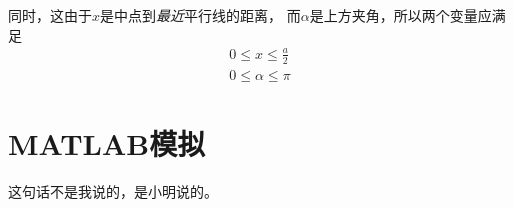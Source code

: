 \documentclass[10pt,a4paper,column,twoside,UTF8]{ctexart}
\begin{document}
		同时，这由于$x$是中点到\emph{最近}平行线的距离，
		而$\alpha$是上方夹角，所以两个变量应满足
		\begin{gather}
			0 \leq x \leq \frac{a}{2}\\
			0 \leq \alpha \leq \pi
		\end{gather}


	\section{MATLAB模拟}
		这句话不是我说的，是小明\cite{example}说的。




	
	
\end{document}
